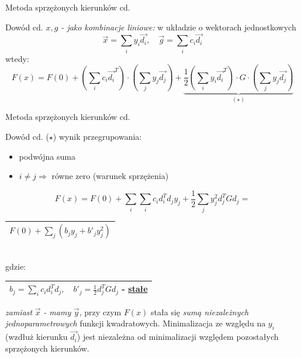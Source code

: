   \begin{frame}{Metoda sprzężonych kierunków cd.}

 	\begin{block}{Dowód cd.}
		\emph{$x, g$ -  jako kombinacje liniowe:} w układzie o wektorach jednostkowych
		\begin{displaymath}
			\vec{x} = \sum_i y_i \vec{d_i}, \quad \vec{g} = \sum_i c_i \vec{d_i}
		\end{displaymath}
		wtedy:
		\begin{displaymath}
			F(x) = F(0) + (\sum_i c_i \vec{d_i}^T) \cdot (\sum_j y_j \vec{d_j}) +
			\underbrace{\frac{1}{2} (\sum_i y_i \vec{d_i}^T) \cdot G \cdot (\sum_j y_j \vec{d_j})}_{(\star)}
		\end{displaymath}
 	\end{block}

  \end{frame}

  \begin{frame}{Metoda sprzężonych kierunków cd.}

 	\begin{block}{Dowód cd.}
 		($\star$) wynik przegrupowania:
		\begin{itemize}
			\item podwójna suma
			\item $i \neq j \Rightarrow$ równe zero (warunek sprzężenia)
		\end{itemize}
		\begin{displaymath}
			F(x) = F(0) + \sum_i \sum_i c_i d_i^T d_j y_j + \frac{1}{2} \sum_j y_j^2 d_j^T G d_j =
		\end{displaymath}
		\begin{center}
		   	\begin{tabular}{|c|}
		   	\hline
				$F(0) + \sum_j (b_j y_j + b'_j y_j^2)$
			\\ \hline
			\end{tabular}
			\smallskip
			\\gdzie:
			\begin{tabular}{|c|}
		   	\hline
				$b_j = \sum_i c_i d_i^T d_j{,} \quad b'_j = \frac{1}{2} d_j^T G d_j$ - \underline{stałe}
			\\ \hline
			\end{tabular}
		\end{center}
		\emph{zamiast} $\vec{x}$ \emph{- mamy} $\vec{y}$, przy czym $F(x)$ stała się \emph{sumą niezależnych jednoparametrowych} funkcji kwadratowych. Minimalizacja ze względu na $y_i$ (wzdłuż kierunku $\vec{d_i}$) jest niezależna od minimalizacji  względem pozostałych sprzężonych kierunków.
 	\end{block}

  \end{frame}

